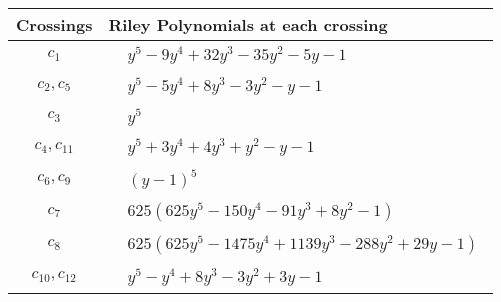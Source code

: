 \documentclass[1p]{elsarticle_modified}
\theoremstyle{definition}
\begin{document}
\begin{tabular}{m{50pt}|m{274pt}}
Crossings & \hspace{64pt}Riley Polynomials at each crossing \\
\hline $$\begin{aligned}c_{1}\end{aligned}$$&$\begin{aligned}
&y^5-9 y^4+32 y^3-35 y^2-5 y-1
\end{aligned}$\\
\hline $$\begin{aligned}c_{2},c_{5}\end{aligned}$$&$\begin{aligned}
&y^5-5 y^4+8 y^3-3 y^2- y-1
\end{aligned}$\\
\hline $$\begin{aligned}c_{3}\end{aligned}$$&$\begin{aligned}
&y^5
\end{aligned}$\\
\hline $$\begin{aligned}c_{4},c_{11}\end{aligned}$$&$\begin{aligned}
&y^5+3 y^4+4 y^3+y^2- y-1
\end{aligned}$\\
\hline $$\begin{aligned}c_{6},c_{9}\end{aligned}$$&$\begin{aligned}
&(y-1)^5
\end{aligned}$\\
\hline $$\begin{aligned}c_{7}\end{aligned}$$&$\begin{aligned}
&625(625 y^5-150 y^4-91 y^3+8 y^2-1)
\end{aligned}$\\
\hline $$\begin{aligned}c_{8}\end{aligned}$$&$\begin{aligned}
&625(625 y^5-1475 y^4+1139 y^3-288 y^2+29 y-1)
\end{aligned}$\\
\hline $$\begin{aligned}c_{10},c_{12}\end{aligned}$$&$\begin{aligned}
&y^5- y^4+8 y^3-3 y^2+3 y-1
\end{aligned}$\\
\hline
\end{tabular}\\~\\
\end{document}
